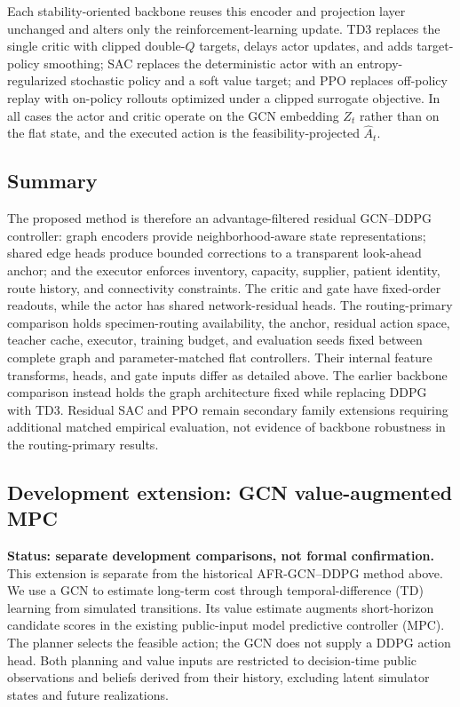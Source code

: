 \documentclass[preprint,review,12pt]{elsarticle}
\begin{document}
Each stability-oriented backbone reuses this encoder and projection layer unchanged and alters only the reinforcement-learning update. TD3 replaces the single critic with clipped double-$Q$ targets, delays actor updates, and adds target-policy smoothing; SAC replaces the deterministic actor with an entropy-regularized stochastic policy and a soft value target; and PPO replaces off-policy replay with on-policy rollouts optimized under a clipped surrogate objective. In all cases the actor and critic operate on the GCN embedding $Z_t$ rather than on the flat state, and the executed action is the feasibility-projected $\hat{A}_t$.

\subsection*{Summary}

The proposed method is therefore an advantage-filtered residual GCN--DDPG controller: graph encoders provide neighborhood-aware state representations; shared edge heads produce bounded corrections to a transparent look-ahead anchor; and the executor enforces inventory, capacity, supplier, patient identity, route history, and connectivity constraints. The critic and gate have fixed-order readouts, while the actor has shared network-residual heads. The routing-primary comparison holds specimen-routing availability, the anchor, residual action space, teacher cache, executor, training budget, and evaluation seeds fixed between complete graph and parameter-matched flat controllers. Their internal feature transforms, heads, and gate inputs differ as detailed above. The earlier backbone comparison instead holds the graph architecture fixed while replacing DDPG with TD3. Residual SAC and PPO remain secondary family extensions requiring additional matched empirical evaluation, not evidence of backbone robustness in the routing-primary results.
\subsection*{Development extension: GCN value-augmented MPC}
\textbf{Status: separate development comparisons, not formal confirmation.}
This extension is separate from the historical AFR-GCN--DDPG method above.
We use a GCN to estimate long-term cost through temporal-difference
(TD) learning from simulated transitions. Its value estimate augments
short-horizon candidate scores in the existing public-input model predictive
controller (MPC). The planner selects the feasible action; the GCN does
not supply a DDPG action head. Both planning and value inputs are restricted
to decision-time public observations and beliefs derived from their history,
excluding latent simulator states and future realizations.
\end{document}

